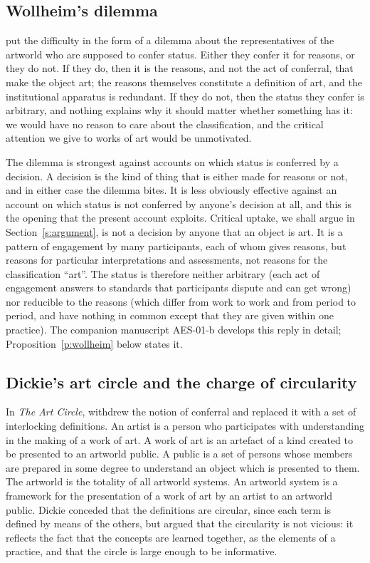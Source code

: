 \documentclass{situationist-preprint}
\begin{document}
\subsection{Wollheim's dilemma}

\citet{Wollheim1980} put the difficulty in the form of a dilemma about the representatives of the artworld who are supposed to confer status. Either they confer it for reasons, or they do not. If they do, then it is the reasons, and not the act of conferral, that make the object art; the reasons themselves constitute a definition of art, and the institutional apparatus is redundant. If they do not, then the status they confer is arbitrary, and nothing explains why it should matter whether something has it: we would have no reason to care about the classification, and the critical attention we give to works of art would be unmotivated.

The dilemma is strongest against accounts on which status is conferred by a decision. A decision is the kind of thing that is either made for reasons or not, and in either case the dilemma bites. It is less obviously effective against an account on which status is not conferred by anyone's decision at all, and this is the opening that the present account exploits. Critical uptake, we shall argue in Section~\ref{s:argument}, is not a decision by anyone that an object is art. It is a pattern of engagement by many participants, each of whom gives reasons, but reasons for particular interpretations and assessments, not reasons for the classification \enquote{art}. The status is therefore neither arbitrary (each act of engagement answers to standards that participants dispute and can get wrong) nor reducible to the reasons (which differ from work to work and from period to period, and have nothing in common except that they are given within one practice). The companion manuscript AES-01-b develops this reply in detail; Proposition~\ref{p:wollheim} below states it.

\subsection{Dickie's art circle and the charge of circularity}

In \emph{The Art Circle}, \citet{Dickie1984} withdrew the notion of conferral and replaced it with a set of interlocking definitions. An artist is a person who participates with understanding in the making of a work of art. A work of art is an artefact of a kind created to be presented to an artworld public. A public is a set of persons whose members are prepared in some degree to understand an object which is presented to them. The artworld is the totality of all artworld systems. An artworld system is a framework for the presentation of a work of art by an artist to an artworld public. Dickie conceded that the definitions are circular, since each term is defined by means of the others, but argued that the circularity is not vicious: it reflects the fact that the concepts are learned together, as the elements of a practice, and that the circle is large enough to be informative.
\end{document}

